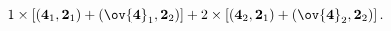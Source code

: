 \begin{equation}
1 \times \left[({\bf 4}_1,{\bf 2}_1)+(\ov{\bf 4}_1,{\bf 2}_2)\right]
+  2  \times \left[ ({\bf 4}_2,{\bf 2}_1)+(\ov{\bf 4}_2,{\bf 2}_2)\right].
\label{EqPS3chiralspectrum}
\end{equation}

